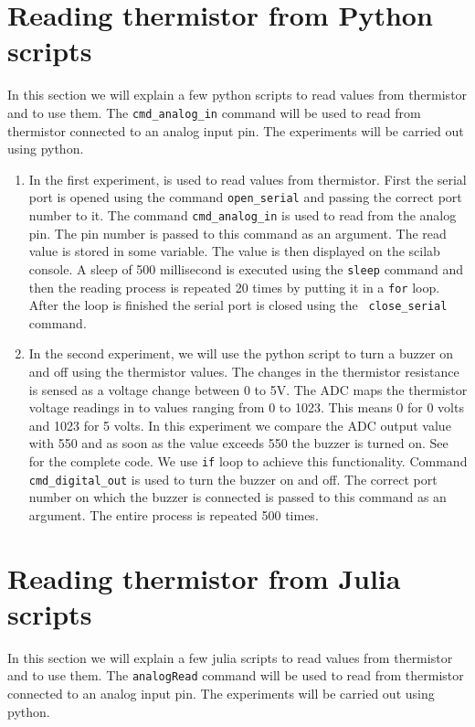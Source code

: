\section {Reading thermistor from Python scripts}
In this section we will explain a few python scripts to read values
from thermistor and to use them.  The {\tt cmd\_analog\_in} command
will be used to read from thermistor connected to an analog input
pin. The experiments will be carried out using python.

\begin{enumerate}
\item In the first experiment,  is used to read
  values from thermistor. First the serial port is opened using the
  command {\tt open\_serial} and passing the correct port number to
  it. The command {\tt cmd\_analog\_in} is used to read from the
  analog pin. The pin number is passed to this command as an
  argument. The read value is stored in some variable. The value is
  then displayed on the scilab console. A sleep of 500 millisecond is
  executed using the {\tt sleep} command and then the reading process
  is repeated 20 times by putting it in a {\tt for} loop. After the
  loop is finished the serial port is closed using the {\tt
    close\_serial} command.

\item In the second experiment, we will use the python script to
  turn a buzzer on and off using the thermistor values. The changes in
  the thermistor resistance is sensed as a voltage change between 0 to
  5V. The ADC maps the thermistor voltage readings in to values
  ranging from 0 to 1023. This means 0 for 0 volts and 1023 for 5
  volts. In this experiment we compare the ADC output value with 550
  and as soon as the value exceeds 550 the buzzer is turned on. See
   for the complete code. We use {\tt if}
  loop to achieve this functionality. Command {\tt cmd\_digital\_out}
  is used to turn the buzzer on and off.  The correct port number on
  which the buzzer is connected is passed to this command as an
  argument. The entire process is repeated 500 times.
\end{enumerate}



\section {Reading thermistor from Julia scripts}
In this section we will explain a few julia scripts to read values
from thermistor and to use them.  The {\tt analogRead} command
will be used to read from thermistor connected to an analog input
pin. The experiments will be carried out using python.

